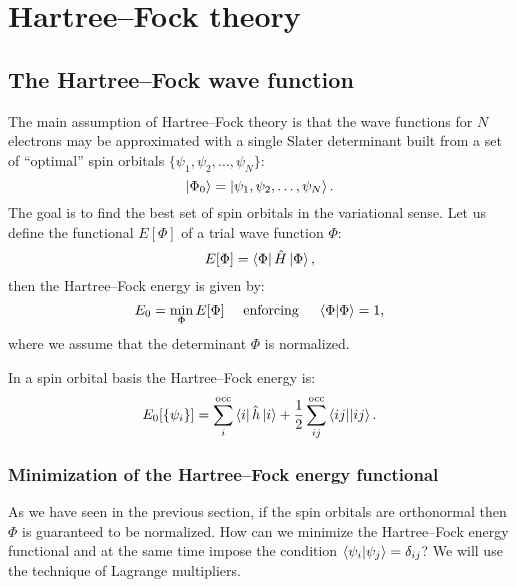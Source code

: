 \documentclass[../Main/chem532-notes.tex]{subfiles}
\begin{document}
\setcounter{chapter}{4}

\chapter{Hartree--Fock theory}

\section{The Hartree--Fock wave function}
The main assumption of Hartree--Fock theory is that the wave functions for $N$ electrons may be approximated with a single Slater determinant built from a set of ``optimal'' spin orbitals $\{ \psi_1, \psi_2, \ldots, \psi_N \}$:
\begin{equation}
\ket{\Phi_0} = \ket{\psi_1, \psi_2, \ldots, \psi_N }.
\end{equation}
The goal is to find the best set of spin orbitals in the variational sense. 
Let us define the functional $E[\Phi]$ of a trial wave function $\Phi$:
\begin{equation}
E[\Phi] = \bra{\Phi} \hat{H} \ket{\Phi},
\end{equation}
then the Hartree--Fock energy is given by:
\begin{equation}
E_0 = \min_{\Phi} E[\Phi] \quad \text{ enforcing }  \quad\braket{\Phi | \Phi} = 1,
\end{equation}
where we assume that the determinant $\Phi$ is normalized.

In a spin orbital basis the Hartree--Fock energy is:
\begin{equation}
E_0[\{ \psi_i \}] = \sum_i^{\rm occ} \bra{i} \hat{h} \ket{i} + \frac{1}{2} \sum_{ij}^{\rm occ} \bra{ij}\!\ket{ij}.
\end{equation}


\subsection{Minimization of the Hartree--Fock energy functional}
As we have seen in the previous section, if the spin orbitals are orthonormal then $\Phi$ is guaranteed to be normalized.
How can we minimize the Hartree--Fock energy functional and at the same time impose the condition $\braket{\psi_i|\psi_j} = \delta_{ij}$?
We will use the technique of Lagrange multipliers.
\end{document}
